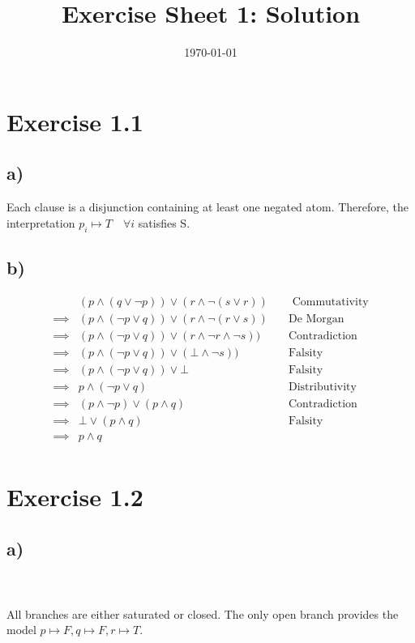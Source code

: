 \documentclass[a4paper]{article}
\begin{document}
\title{Exercise Sheet 1: Solution}
\author{}
\date{\today}
\section{Exercise 1.1}
\subsection{a)}
Each clause is a disjunction containing at least one negated atom. Therefore, the interpretation $p_i \mapsto T \quad \forall i$ satisfies S.
\subsection{b)}
\begin{align*}
&(p \land (q \lor \lnot p))\lor(r \land \lnot(s \lor r)) \quad& \text{ Commutativity}\\
\implies&(p \land (\lnot p \lor q))\lor(r \land \lnot(r \lor s)) & \text{De Morgan}\\
\implies&(p \land (\lnot p \lor q))\lor(r \land \lnot r \land \lnot s)) & \text{Contradiction}\\
\implies&(p \land (\lnot p \lor q))\lor(\bot \land \lnot s)) & \text{Falsity}\\
\implies&(p \land (\lnot p \lor q))\lor\bot & \text{Falsity}\\
\implies& p \land (\lnot p \lor q) & \text{Distributivity}\\
\implies&(p \land \lnot p) \lor (p \land q) & \text{Contradiction}\\
\implies&\bot \lor (p \land q) & \text{Falsity}\\
\implies& p \land q & \\
\end{align*}
\section{Exercise 1.2}
\subsection{a)}
\\\\
All branches are either saturated or closed. The only open branch provides the model
$p \mapsto F, q \mapsto F, r \mapsto T$.
\end{document}
